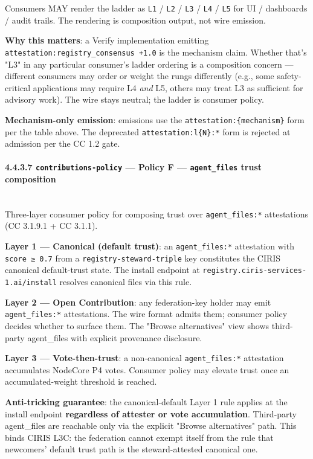 \documentclass[11pt]{article}
\begin{document}
Consumers MAY render the ladder as \texttt{L1} / \texttt{L2} / \texttt{L3} / \texttt{L4} / \texttt{L5} for UI / dashboards / audit trails. The rendering is composition output, not wire emission.


\textbf{Why this matters}: a Verify implementation emitting \texttt{attestation:registry\_consensus +1.0} is the mechanism claim. Whether that's "L3" in any particular consumer's ladder ordering is a composition concern — different consumers may order or weight the rungs differently (e.g., some safety-critical applications may require L4 \textit{and} L5, others may treat L3 as sufficient for advisory work). The wire stays neutral; the ladder is consumer policy.


\textbf{Mechanism-only emission}: emissions use the \texttt{attestation:\{mechanism\}} form per the table above. The deprecated \texttt{attestation:l\{N\}:*} form is rejected at admission per the CC 1.2 gate.


\paragraph{4.4.3.7 \texttt{contributions-policy} — Policy F — \texttt{agent\_files} trust composition}\mbox{}\\


Three-layer consumer policy for composing trust over \texttt{agent\_files:*} attestations (CC 3.1.9.1 + CC 3.1.1).


\textbf{Layer 1 — Canonical (default trust)}: an \texttt{agent\_files:*} attestation with \texttt{score ≥ 0.7} from a \texttt{registry-steward-triple} key constitutes the CIRIS canonical default-trust state. The install endpoint at \texttt{registry.ciris-services-1.ai/install} resolves canonical files via this rule.


\textbf{Layer 2 — Open Contribution}: any federation-key holder may emit \texttt{agent\_files:*} attestations. The wire format admits them; consumer policy decides whether to surface them. The "Browse alternatives" view shows third-party agent\_files with explicit provenance disclosure.


\textbf{Layer 3 — Vote-then-trust}: a non-canonical \texttt{agent\_files:*} attestation accumulates NodeCore P4 votes. Consumer policy may elevate trust once an accumulated-weight threshold is reached.


\textbf{Anti-tricking guarantee}: the canonical-default Layer 1 rule applies at the install endpoint \textbf{regardless of attester or vote accumulation}. Third-party agent\_files are reachable only via the explicit "Browse alternatives" path. This binds CIRIS L3C: the federation cannot exempt itself from the rule that newcomers' default trust path is the steward-attested canonical one.
\end{document}
